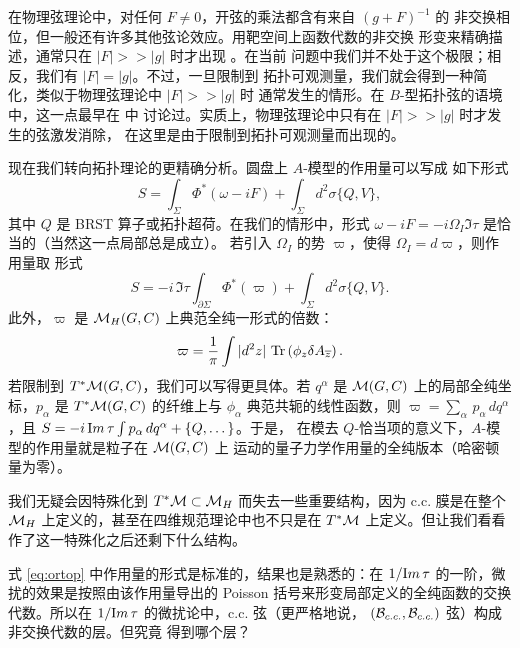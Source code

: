 在物理弦理论中，对任何 $F\not=0$，开弦的乘法都含有来自 $(g+F)^{-1}$ 的
非交换相位，但一般还有许多其他弦论效应。用靶空间上函数代数的非交换
形变来精确描述，通常只在 $|F|>>|g|$ 时才出现 。在当前
问题中我们并不处于这个极限；相反，我们有 $|F|=|g|$。不过，一旦限制到
拓扑可观测量，我们就会得到一种简化，类似于物理弦理论中 $|F|>>|g|$ 时
通常发生的情形。在 $B$-型拓扑弦的语境中，这一点最早在 \cite{ref71} 中
讨论过。实质上，物理弦理论中只有在 $|F|>>|g|$ 时才发生的弦激发消除，
在这里是由于限制到拓扑可观测量而出现的。

现在我们转向拓扑理论的更精确分析。圆盘上 $A$-模型的作用量可以写成
如下形式 %
\setcounter{equation}{7}
\begin{equation}\label{eq:mortop}
S=\int_\Sigma \Phi^*(\omega-iF)+\int_\Sigma d^2\sigma \{Q,V\},
\end{equation}
 其中 $Q$ 是 BRST 算子或拓扑超荷。在我们的情形中，形式
$\omega-iF=-i \Omega_I \Im\tau$ 是恰当的（当然这一点局部总是成立）。
若引入 $\Omega_I$ 的势 $\varpi$，使得 $\Omega_I=d\varpi$，则作用量取
形式 %
\setcounter{equation}{8}
\begin{equation}\label{eq:ortop}
S=-i\,\Im\tau\int_{\partial\Sigma}\Phi^*(\varpi) +\int_\Sigma
d^2\sigma \{Q,V\}.
\end{equation}
 此外，$\varpi$ 是 $\M_H(G,C)$ 上典范全纯一形式的倍数： %
\setcounter{equation}{9}
\begin{equation}\label{eq:honop}
\varpi={1\over \pi}\int |d^2 z|\, \Tr \left(\phi_z\delta
A_\bz\right).
\end{equation}
  若限制到 $T^*\M(G,C)$，我们可以写得更具体。若 $q^\alpha$ 是
$\M(G,C)$ 上的局部全纯坐标，$p_\alpha$ 是 $T^*\M(G,C)$ 的纤维上与
$\phi_\alpha$ 典范共轭的线性函数，则
$\varpi=\sum_\alpha \,p_\alpha\,dq^\alpha$，且
$S=-i\,{\rm Im}\,\tau\int p_\alpha\,dq^\alpha+\{Q,\dots\}$。于是，
在模去 $Q$-恰当项的意义下，$A$-模型的作用量就是粒子在 $\cM(G,C)$ 上
运动的量子力学作用量的全纯版本（哈密顿量为零）。

我们无疑会因特殊化到 $T^*\M\subset \MH$ 而失去一些重要结构，因为
c.c. 膜是在整个 $\MH$ 上定义的，甚至在四维规范理论中也不只是在
$T^*\M$ 上定义。但让我们看看作了这一特殊化之后还剩下什么结构。

式 \eqref{eq:ortop} 中作用量的形式是标准的，结果也是熟悉的：在
${1/ {\rm Im}\,\tau}$ 的一阶，微扰的效果是按照由该作用量导出的
Poisson 括号来形变局部定义的全纯函数的交换代数。所以在
${1/{\rm Im}\,\tau}$ 的微扰论中，c.c. 弦（更严格地说，
$({\cal B}_{c.c.},{\cal B}_{c.c.})$ 弦）构成非交换代数的层。但究竟
得到哪个层？

